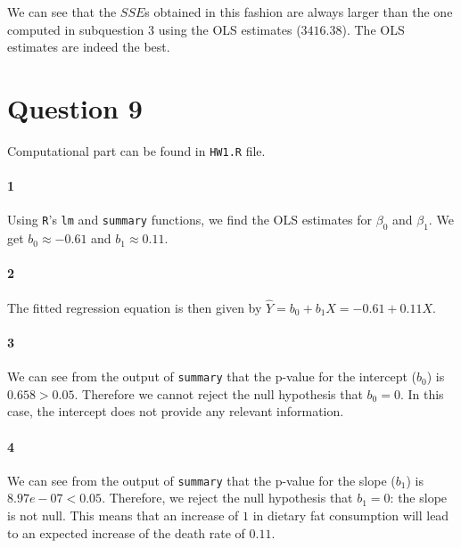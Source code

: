 \documentclass[]{article}
\let\oldparagraph\paragraph
\renewcommand{\paragraph}[1]{\oldparagraph{#1}\mbox{}}
\begin{document}
We can see that the $SSE$s obtained in this fashion are always larger than the one computed in subquestion 3 using the OLS estimates ($3416.38$). The OLS estimates are indeed the best.

\section*{Question 9}






Computational part can be found in \texttt{HW1.R} file.

\paragraph{1}
Using \texttt{R}'s \texttt{lm} and \texttt{summary} functions, we find the OLS estimates for $\beta_0$ and $\beta_1$. We get $b_0 \approx -0.61$ and $b_1 \approx 0.11$.

\paragraph{2}
The fitted regression equation is then given by $\hat{Y} = b_0 + b_1 X = -0.61 + 0.11 X$.

\paragraph{3}
We can see from the output of \texttt{summary} that the p-value for the intercept ($b_0$) is $0.658 > 0.05$. Therefore we cannot reject the null hypothesis that $b_0 = 0$. In this case, the intercept does not provide any relevant information.%

\paragraph{4}
We can see from the output of \texttt{summary} that the p-value for the slope ($b_1$) is $8.97e-07 < 0.05$. Therefore, we reject the null hypothesis that $b_1 = 0$: the slope is not null. This means that an increase of $1$ in dietary fat consumption will lead to an expected increase of the death rate of $0.11$.
\end{document}
